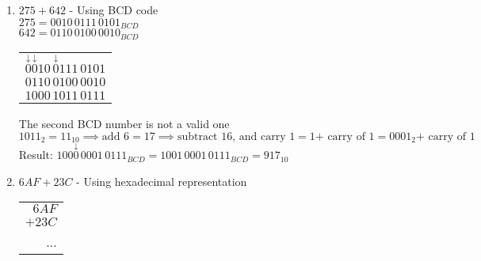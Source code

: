 \documentclass[a4paper]{article}
\begin{document}
\begin{enumerate}[label=(\alph*)]
		$69 = 0110\,1001_{BCD}$\\
		$58 = 0101\,1000_{BCD}$\\
		
		\begin{tabular}{r}
			$\overset{\downarrow}{0}110\,1001_2$\\
			$+0101\,1000_2$\\
			\hline
			$1011\,10001_2$
		\end{tabular}
		\quad Both parts of the number are not valid BCD code (higher than 9). 
		
		$10001_{BCD} = 17_{10} \implies \text{Adding 6} = 23_{10} \implies \text{Subtracting 16} + \text{Carry of 1 to the next number} = 7 + \text{Carry of 1 to the next number} = 0111_{BCD} + \text{Carry of 1 to the next number}$\\
		$101\overset{\downarrow}{1}_{BCD} = 1100_{BCD} = 12 \implies \text{Adding 6} = 18 \implies \text{Subtracting 16 + carry of 1 to the next number} = 2 \text{carry of 1} = 0001\,0010_{BCD}$\\
		Result: $0001\,0010\,0111_{BCD} = 127_{10}$
		
		\item $275 + 642$ - Using BCD code\\
		$275 = 0010\,0111\,0101_{BCD}$\\
		$642 = 0110\,0100\,0010_{BCD}$\\
		
		\begin{tabular}{r}
			$\overset{\downarrow}{0}\overset{\downarrow}{0}10\,\overset{\downarrow}{0}111\,0101$\\
			$0110\,0100\,0010$\\
			\hline
			$1000\,1011\,0111$
		\end{tabular}
		\quad The second BCD number is not a valid one\\
		$1011_2 = 11_{10} \implies \text{add 6} = 17 \implies \text{subtract 16, and carry 1} = 1 \text{+ carry of 1} = 0001_2 \text{+ carry of 1}$\\
		Result: $100\overset{\downarrow}{0}\,0001\,0111_{BCD} = 1001\,0001\,0111_{BCD} = 917_{10}$
		
		\item $6AF + 23C$ - Using hexadecimal representation\\
		
		\begin{tabular}{r}
			$6AF$\\
			$+23C$\\
			\hline
			...\\
		\end{tabular}
		

\end{enumerate}
\end{document}
